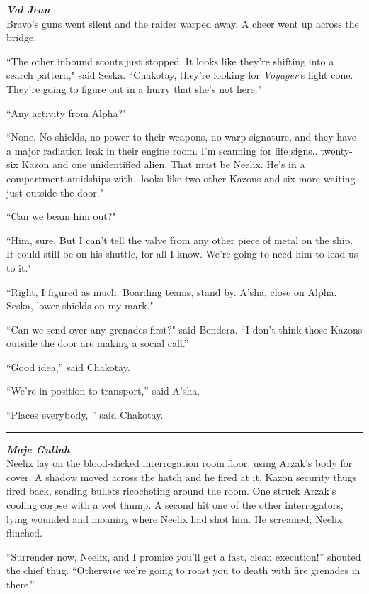 \documentclass[twoside,letterpaper,12pt]{memoir}
\begin{document}
\noindent\textit{\textbf{Val Jean}}\\

Bravo’s guns went silent and the raider warped away. A cheer went up across the bridge.

``The other inbound scouts just stopped. It looks like they're shifting into a search pattern," said Seska. ``Chakotay, they're looking for \textit{Voyager}'s light cone. They're going to figure out in a hurry that she's not here." 

``Any activity from Alpha?"

``None. No shields, no power to their weapons, no warp signature, and they have a major radiation leak in their engine room. I'm scanning for life signs...twenty-six Kazon and one unidentified alien. That must be Neelix. He’s in a compartment amidships with...looks like two other Kazons and six more waiting just outside the door."

``Can we beam him out?"

``Him, sure. But I can’t tell the valve from any other piece of metal on the ship. It could still be on his shuttle, for all I know. We’re going to need him to lead us to it."

``Right, I figured as much. Boarding teams, stand by. A'sha, close on Alpha. Seska, lower shields on my mark."

``Can we send over any grenades first?" said Bendera. “I don’t think those Kazons outside the door are making a social call.”

``Good idea,” said Chakotay.

“We’re in position to transport,” said A’sha.

“Places everybody, ” said Chakotay.

\begin{center}\rule{3cm}{0.4 pt}\end{center}

\noindent\textit{\textbf{Maje Gulluh}}\\

Neelix lay on the blood-slicked interrogation room floor, using Arzak's body for cover. A shadow moved across the hatch and he fired at it. Kazon security thugs fired back, sending bullets ricocheting around the room. One struck Arzak’s cooling corpse with a wet thump. A second hit one of the other interrogators, lying wounded and moaning where Neelix had shot him. He screamed; Neelix flinched.

“Surrender now, Neelix, and I promise you’ll get a fast, clean execution!” shouted the chief thug. “Otherwise we’re going to roast you to death with fire grenades in there.”
\end{document}

